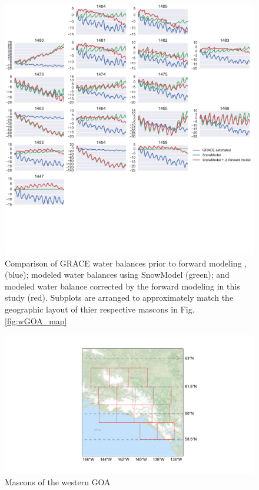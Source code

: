 \documentclass[review,oneside]{igs}
\begin{document}
\begin{figure}
\noindent\includegraphics[width=178mm]{figures/westernPlot} \centering \caption{Comparison of GRACE water balances prior to forward modeling \citep{luthcke_antarctica_2013}, (blue); modeled water balances using SnowModel \citep{beamer_high-resolution_2016} (green); and modeled water balance corrected by the forward modeling in this study (red). Subplots are arranged to approximately match the geographic layout of thier respective mascons in Fig. \ref{fig:wGOA_map}} \label{fig:wGOA_plot}
\end{figure}

\begin{figure}
\noindent\includegraphics[width=178mm]{figures/easternMap} \centering \caption{Mascons of the western GOA} \label{fig:summer}
\end{figure}
\end{document}
